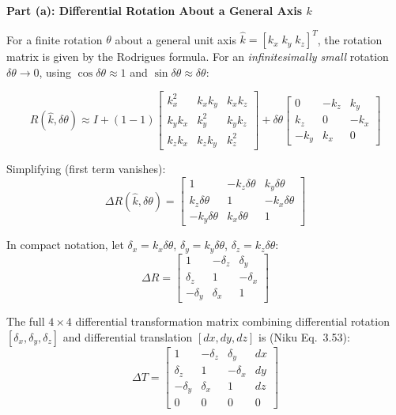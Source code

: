 \documentclass[12pt,a3paper]{article}
\begin{document}
\begin{enumerate}
\begin{tcolorbox}[enhanced,breakable,ansbox,colback=cB!4,colframe=cB,
  boxrule=0.8pt,arc=5pt,
  title={\textbf{Answer}},fonttitle=\bfseries\color{white},
  colbacktitle=cB]

\textbf{Part (a): Differential Rotation About a General Axis $k$}

\medskip
For a finite rotation $\theta$ about a general unit axis
$\hat{k} = [k_x\;k_y\;k_z]^T$, the rotation matrix is given by the
Rodrigues formula. For an \emph{infinitesimally small} rotation
$\delta\theta \to 0$, using $\cos\delta\theta \approx 1$ and
$\sin\delta\theta \approx \delta\theta$:

\[
  R(\hat{k},\delta\theta) \approx I + (1-1)
  \begin{bmatrix}k_x^2&k_xk_y&k_xk_z\\k_yk_x&k_y^2&k_yk_z\\k_zk_x&k_zk_y&k_z^2\end{bmatrix}
  + \delta\theta
  \begin{bmatrix}0&-k_z&k_y\\k_z&0&-k_x\\-k_y&k_x&0\end{bmatrix}
\]

Simplifying (first term vanishes):
\[
  \boxed{
    \Delta R(\hat{k},\delta\theta)
    = \begin{bmatrix}
        1        & -k_z\delta\theta &  k_y\delta\theta \\
        k_z\delta\theta &  1       & -k_x\delta\theta \\
       -k_y\delta\theta &  k_x\delta\theta &  1
      \end{bmatrix}
  }
\]

In compact notation, let
$\delta_x = k_x\delta\theta$,\;
$\delta_y = k_y\delta\theta$,\;
$\delta_z = k_z\delta\theta$:
\[
  \Delta R =
  \begin{bmatrix}
    1       & -\delta_z &  \delta_y \\
    \delta_z &  1       & -\delta_x \\
   -\delta_y &  \delta_x &  1
  \end{bmatrix}
\]

The full $4\times4$ differential transformation matrix combining
differential rotation $[\delta_x,\delta_y,\delta_z]$ and differential
translation $[dx,dy,dz]$ is (Niku Eq.~3.53):
\[
  \Delta T =
  \begin{bmatrix}
    1       & -\delta_z &  \delta_y & dx \\
    \delta_z &  1       & -\delta_x & dy \\
   -\delta_y &  \delta_x &  1       & dz \\
    0        &  0        &  0       &  0
  \end{bmatrix}
\]


\end{tcolorbox}
\end{enumerate}
\end{document}

